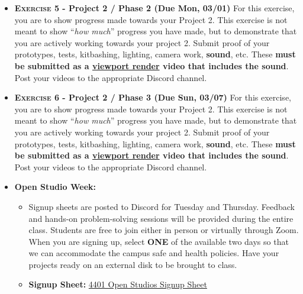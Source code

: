 \def\dMon{Mon, 03/01}
\def\dTues{Tues, 03/02}
\def\dWed{Wed, 03/03}
\def\dThur{Thur, 03/04}
\def\dFri{Fri, 03/05}
\def\dSat{Sat, 03/06}
\def\dSun{Sun, 03/07}
\placeDate



% 
\begin{itemize}[noitemsep,topsep=0pt,leftmargin=*]
    \item \textbf{\textsc{Exercise 5} - Project 2 / Phase 2 (Due \dMon)} For this exercise, you are to show progress made towards your Project 2. This exercise is not meant to show ``\emph{how much}'' progress you have made, but to demonstrate that you are actively working towards your project 2. Submit proof of your prototypes, tests, kitbashing, lighting, camera work, \textbf{sound}, etc. These \textbf{must be submitted as a \href{https://docs.blender.org/manual/en/latest/editors/3dview/viewport_render.html}{viewport render} video that includes the sound}. Post your videos to the appropriate Discord channel.
    \item \textbf{\textsc{Exercise 6} - Project 2 / Phase 3 (Due \dSun)} For this exercise, you are to show progress made towards your Project 2. This exercise is not meant to show ``\emph{how much}'' progress you have made, but to demonstrate that you are actively working towards your project 2. Submit proof of your prototypes, tests, kitbashing, lighting, camera work, \textbf{sound}, etc. These \textbf{must be submitted as a \href{https://docs.blender.org/manual/en/latest/editors/3dview/viewport_render.html}{viewport render} video that includes the sound}. Post your videos to the appropriate Discord channel.
    \item \textcolor{defaultColor}{\textbf{Open Studio Week:}}
    \begin{itemize}
              \item Signup sheets are posted to Discord for Tuesday and Thursday. Feedback and hands-on problem-solving sessions will be provided during the entire class. Students are free to join either in person or virtually through Zoom. When you are signing up, select \textbf{ONE} of the available two days so that we can accommodate the campus safe and health policies.  Have your projects ready on an external disk to be brought to class.
              \item \textbf{Signup Sheet:} \href{https://docs.google.com/spreadsheets/d/1ipdRdrNSbPkMpchORybS6Fx0hvsXnFQzyQ64Ml3oH3A/edit?usp=sharing}{4401 Open Studios Signup Sheet}
          \end{itemize}
\end{itemize}